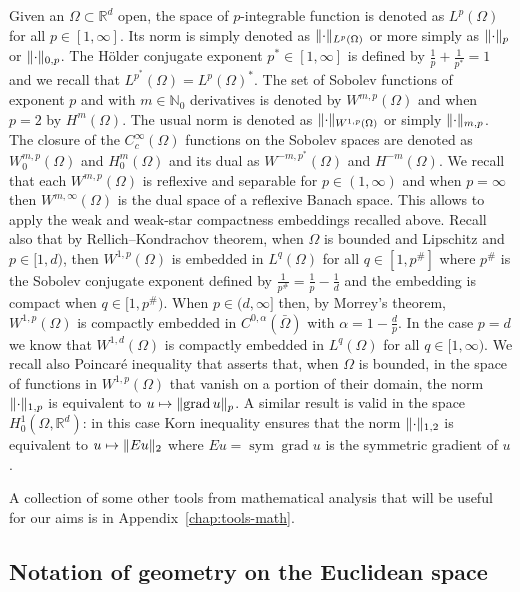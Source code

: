 \documentclass[a4paper,10pt,oneside]{amsbook}
\numberwithin{section}{chapter}
\numberwithin{equation}{chapter}
\theoremstyle{definition}
\DeclareMathOperator{\sym}{sym}
\DeclareMathOperator{\grad}{grad}
\DeclarePairedDelimiter{\norm}{\lVert}{\rVert}
\begin{document}
Given an $\Omega\subset\mathbb{R}^d$ open, the space of $p$-integrable function is denoted as $L^p(\Omega)$ for all $p\in[1,\infty]$. Its norm is simply denoted as $\norm{\cdot}_{L^p(\Omega)}$ or more simply as $\norm{\cdot}_p$ or $\norm{\cdot}_{0,p}$. The H\"older conjugate exponent $p^*\in[1,\infty]$ is defined by $\frac{1}{p}+\frac{1}{p^*}=1$ and we recall that $L^{p^*}(\Omega)=L^p(\Omega)^*$. The set of Sobolev functions of exponent $p$ and with $m\in\mathbb{N}_0$ derivatives is denoted by $W^{m,p}(\Omega)$ and when $p=2$ by $H^m(\Omega)$. The usual norm is denoted as $\norm{\cdot}_{W^{1,p}(\Omega)}$ or simply $\norm{\cdot}_{m,p}$. The closure of the $C^\infty_c(\Omega)$ functions on the Sobolev spaces are denoted as $W^{m,p}_0(\Omega)$ and $H^m_0(\Omega)$ and its dual as $W^{-m,p^*}(\Omega)$ and $H^{-m}(\Omega)$. We recall that each $W^{m,p}(\Omega)$ is reflexive and separable for $p\in(1,\infty)$ and when $p=\infty$ then $W^{m,\infty}(\Omega)$ is the dual space of a reflexive Banach space. This allows to apply the weak and weak-star compactness embeddings recalled above. Recall also that by Rellich--Kondrachov theorem, when $\Omega$ is bounded and Lipschitz and $p\in[1,d)$, then $W^{1,p}(\Omega)$ is embedded in $L^q(\Omega)$ for all $q\in[1,p^\#]$ where $p^\#$ is the Sobolev conjugate exponent defined by $\frac{1}{p^\#}=\frac{1}{p}-\frac{1}{d}$ and the embedding is compact when $q\in[1,p^\#)$. When $p\in(d,\infty]$ then, by Morrey's theorem, $W^{1,p}(\Omega)$ is compactly embedded in $C^{0,\alpha}(\bar\Omega)$ with $\alpha=1-\frac{d}{p}$. In the case $p=d$ we know that $W^{1,d}(\Omega)$ is compactly embedded in $L^q(\Omega)$ for all $q\in[1,\infty)$. We recall also Poincaré inequality that asserts that, when $\Omega$ is bounded, in the space of functions in $W^{1,p}(\Omega)$ that vanish on a portion of their domain, the norm $\norm{\cdot}_{1,p}$ is equivalent to $u\mapsto\norm{\grad u}_p$. A similar result is valid in the space $H^1_0(\Omega,\mathbb{R}^d)$: in this case Korn inequality ensures that the norm $\norm{\cdot}_{1,2}$ is equivalent to $u\mapsto\norm{Eu}_2$ where $Eu=\sym\grad u$ is the symmetric gradient of $u$.

A collection of some other tools from mathematical analysis that will be useful for our aims is in Appendix~\ref{chap:tools-math}.

\subsection*{Notation of geometry on the Euclidean space}
\end{document}
